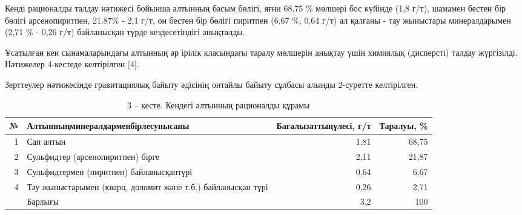 \begin{multicols}{2}
Кенді рационалды талдау нәтижесі бойынша алтынның басым бөлігі, яғни
68,75 \% мөлшері бос күйінде (1,8 г/т), шамамен бестен бір бөлігі
арсенопиритпен, 21.87\% - 2,1 г/т, он бестен бір бөлігі пиритпен (6,67
\%, 0,64 г/т) ал қалғаны - тау жыныстары минералдарымен (2,71 \% - 0,26
г/т) байланысқан түрде кездесетіндігі анықталды.

Ұсатылған кен сынамаларындағы алтынның әр ірілік класындағы таралу
мөлшерін анықтау үшін химиялық (дисперсті) талдау жүргізілді. Нәтижелер
4-кестеде келтірілген {[}4{]}.


Зерттеулер нәтижесінде гравитациялық байыту әдісінің онтайлы байыту
сұлбасы алынды 2-суретте келтірілген.
\end{multicols}

\begin{table}[H]
\caption*{3 -- кесте. Кендегі алтынның рационалды құрамы}
\centering
\begin{tabular}{|r|p{}|r|r|}
\hline
\multicolumn{1}{|l|}{№} & Алтынныңминералдарменбірлесунысаны & \multicolumn{1}{l|}{Бағалызаттыңүлесі, г/т} & \multicolumn{1}{l|}{Таралуы, \%} \\ \hline
1                      & Сап алтын                                                    & 1,81 & 68,75 \\ \hline
2                      & Сульфидтер (арсенопиритпен) бірге                            & 2,11 & 21,87 \\ \hline
3                      & Сульфидтермен (пиритпен) байланысқантүрі                     & 0,64 & 6,67  \\ \hline
4                      & Тау жыныстарымен (кварц, доломит және т.б.) байланысқан түрі & 0,26 & 2,71  \\ \hline
\multicolumn{1}{|l|}{} & Барлығы                                                      & 3,2  & 100   \\ \hline
\end{tabular}%
\end{table}


